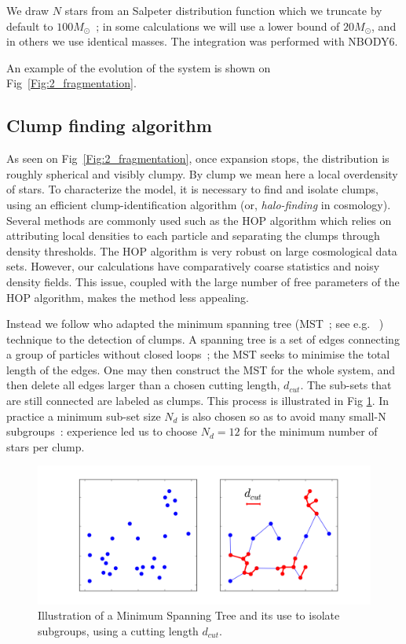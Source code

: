We draw $N$ stars from an Salpeter distribution function which we truncate by default to $100 M_\odot$~; in some calculations we will  use a lower bound of $20 M_\odot$, and in others we use identical masses. The integration was performed with NBODY6.  

An example of the evolution of the system is shown on Fig~\ref{Fig:2_fragmentation}. 





\subsection{Clump finding algorithm}

As seen on Fig~\ref{Fig:2_fragmentation}, once expansion stops, the distribution is roughly spherical and visibly clumpy. By clump we mean here a local overdensity of stars. To characterize the model, it is necessary to find and isolate clumps, using an efficient clump-identification algorithm (or, {\it halo-finding} in cosmology).  Several methods are commonly used such as the HOP algorithm \citep{Eisenstein1998,Skory2010} which relies on attributing local densities to each particle and separating the clumps through density thresholds. The HOP algorithm is very robust on large cosmological data sets. However, our calculations have comparatively coarse statistics and noisy density fields. This issue, coupled with the  large number of free parameters of the HOP algorithm, makes the method less appealing. 

Instead we follow \cite{Maschberger2010} who adapted the minimum spanning tree (MST~; see e.g. ~\citealt{Allison2009b,Olczak2011}) technique to the detection of clumps. A spanning tree is a set of edges connecting a group of  particles without closed loops~; the MST seeks to minimise the total length of the edges. One may then construct the MST for the whole system, and then delete all edges larger than a chosen cutting length, $d_{cut}$. The sub-sets that are still connected  are labeled as clumps. This process is illustrated in Fig \ref{Fig:2_MST}. In practice a minimum sub-set size $N_d$  is also chosen so as to avoid many small-N subgroups~: experience led us to choose  $N_d = 12$ for the minimum number of stars per clump. 

\begin{figure}
\begin{center}
\includegraphics[width=0.8\columnwidth]{Figures/2_MST.png}
\end{center}
\caption{Illustration of a Minimum Spanning Tree and its use to isolate subgroups, using a cutting length $d_{cut}$.}
\label{Fig:2_MST}
\end{figure}


